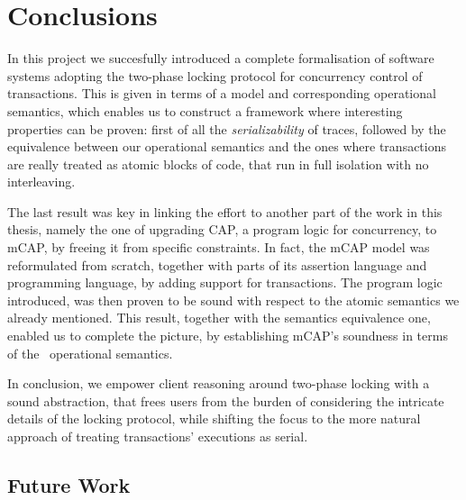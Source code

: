 \section{Conclusions}

In this project we succesfully introduced a complete formalisation of software systems adopting the two-phase locking protocol for concurrency control of transactions. This is given in terms of a model and corresponding operational semantics, which enables us to construct a framework where interesting properties can be proven: first of all the \textit{serializability} of traces, followed by the equivalence between our operational semantics and the ones where transactions are really treated as atomic blocks of code, that run in full isolation with no interleaving.

The last result was key in linking the effort to another part of the work in this thesis, namely the one of upgrading CAP, a program logic for concurrency, to mCAP, by freeing it from specific constraints. In fact, the mCAP model was reformulated from scratch, together with parts of its assertion language and programming language, by adding support for transactions. The program logic introduced, was then proven to be sound with respect to the atomic semantics we already mentioned. This result, together with the semantics equivalence one, enabled us to complete the picture, by establishing mCAP's soundness in terms of the \tpl\ operational semantics.

In conclusion, we empower client reasoning around two-phase locking with a sound abstraction, that frees users from the burden of considering the intricate details of the locking protocol, while shifting the focus to the more natural approach of treating transactions' executions as serial.

\subsection{Future Work}

